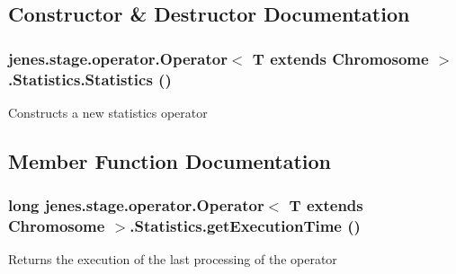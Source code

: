 \subsection{Constructor \& Destructor Documentation}
\hypertarget{classjenes_1_1stage_1_1operator_1_1_operator_3_01_t_01extends_01_chromosome_01_4_1_1_statistics_daa59a7b449045b5fd3c9abd3fbecf23}{
\subsubsection[Statistics]{\setlength{\rightskip}{0pt plus 5cm}jenes.stage.operator.Operator$<$ T extends Chromosome $>$.Statistics.Statistics ()}}
\label{classjenes_1_1stage_1_1operator_1_1_operator_3_01_t_01extends_01_chromosome_01_4_1_1_statistics_daa59a7b449045b5fd3c9abd3fbecf23}


Constructs a new statistics operator 

\subsection{Member Function Documentation}
\hypertarget{classjenes_1_1stage_1_1operator_1_1_operator_3_01_t_01extends_01_chromosome_01_4_1_1_statistics_7ad4b3ece9b2cdbf4a9142eda087a12d}{
\subsubsection[getExecutionTime]{\setlength{\rightskip}{0pt plus 5cm}long jenes.stage.operator.Operator$<$ T extends Chromosome $>$.Statistics.getExecutionTime ()}}
\label{classjenes_1_1stage_1_1operator_1_1_operator_3_01_t_01extends_01_chromosome_01_4_1_1_statistics_7ad4b3ece9b2cdbf4a9142eda087a12d}


Returns the execution of the last processing of the operator

